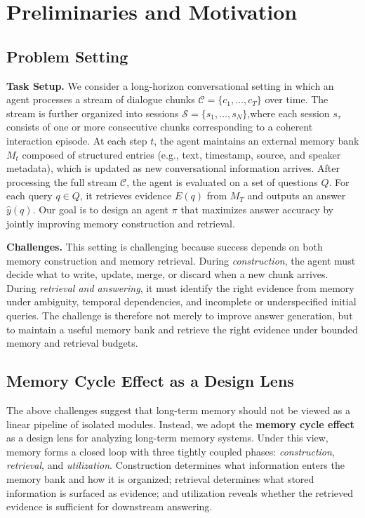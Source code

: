 \section{Preliminaries and Motivation}
\subsection{Problem Setting}
\noindent\textbf{Task Setup.}
We consider a long-horizon conversational setting in which an agent processes a stream of dialogue chunks
$\mathcal{C}=\{c_1,\ldots,c_T\}$ over time. 
The stream is further organized into sessions $\mathcal{S}=\{s_1,\ldots,s_N\}$,where each session $s_\tau$ consists of one or more consecutive chunks corresponding to a coherent interaction episode.
At each step $t$, the agent maintains an external memory bank $M_t$ composed of structured entries
(e.g., text, timestamp, source, and speaker metadata), which is updated as new conversational information arrives.
After processing the full stream $\mathcal{C}$, the agent is evaluated on a set of questions $Q$.
For each query $q \in Q$, it retrieves evidence $E(q)$ from $M_T$ and outputs an answer $\hat{y}(q)$.
Our goal is to design an agent $\pi$ that maximizes answer accuracy by jointly improving memory construction and retrieval.


\noindent\textbf{Challenges.}
This setting is challenging because success depends on both memory construction and memory retrieval.
During \emph{construction}, the agent must decide what to write, update, merge, or discard when a new chunk arrives.
During \emph{retrieval and answering}, it must identify the right evidence from memory under ambiguity, temporal dependencies, and incomplete or underspecified initial queries.
The challenge is therefore not merely to improve answer generation, but to maintain a useful memory bank and retrieve the right evidence under bounded memory and retrieval budgets.


\subsection{Memory Cycle Effect as a Design Lens}
\label{ssec:cycle_effect}
The above challenges suggest that long-term memory should not be viewed as a linear pipeline of isolated modules.
Instead, we adopt the \textbf{memory cycle effect}~\cite{zhang2025learn} as a design lens for analyzing long-term memory systems.
Under this view, memory forms a closed loop with three tightly coupled phases: \emph{construction}, \emph{retrieval}, and \emph{utilization}.
Construction determines what information enters the memory bank and how it is organized; retrieval determines what stored information is surfaced as evidence; and utilization reveals whether the retrieved evidence is sufficient for downstream answering.

